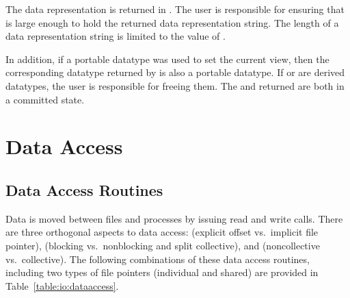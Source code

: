 The data representation is returned in .
The user is responsible for ensuring that  is
large enough to hold the returned data representation string.
The length of a data representation string is limited to the value of
.

In addition, if a portable datatype was used to set the current view,
then the corresponding datatype returned by 
is also a portable datatype.
If  or  are derived datatypes,
the user is responsible for freeing them.
The  and  returned are both in a
committed state.

\section{Data Access}
\label{sec:io-access}

\subsection{Data Access Routines}

Data is moved between files and processes by issuing read and write calls.
There are three orthogonal aspects to data access:
 (explicit offset vs.\ implicit file pointer),
 (blocking vs.\ nonblocking and split collective),
and  (noncollective vs.\ collective).
The following combinations of these data access routines,
including two types of file pointers (individual and shared)
are provided in Table~\ref{table:io:dataaccess}.


